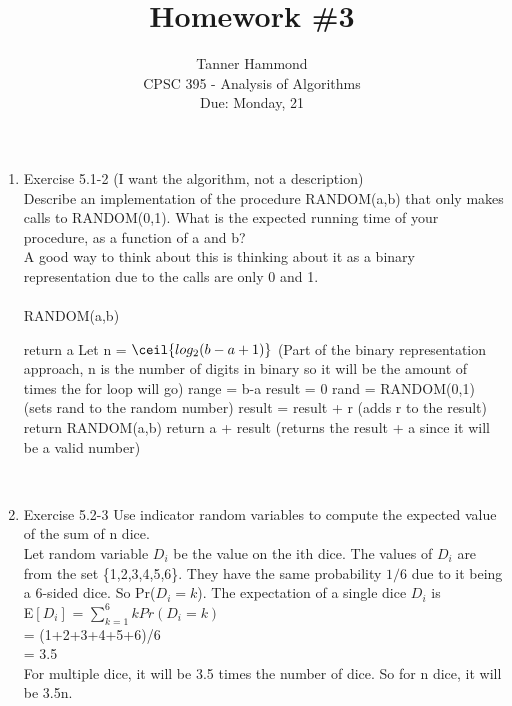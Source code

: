 \documentclass[12pt]{article}
\begin{document}
 
 
 
\title{Homework \#3}%
\author{Tanner Hammond\\ %
CPSC 395 - Analysis of Algorithms
\\ Due: Monday, 21} %
\date{}
\maketitle

\begin{enumerate}
\item Exercise 5.1-2 (I want the algorithm, not a description) \\
Describe an implementation of the procedure RANDOM(a,b) that only makes calls
to RANDOM(0,1). What is the expected running time of your procedure, as a
function of a and b? \\
A good way to think about this is thinking about it as a binary representation due to the calls are only 0 and 1. \\
\\
RANDOM(a,b) 
\begin{algorithmic}
\STATE return a
\ENDIF
\STATE Let n = $\ceil{log_2(b-a+1)}$ (Part of the binary representation approach, n is the number of digits in binary so it will be the amount of times the for loop will go) 
\STATE range = b-a
\STATE result = 0 
\STATE rand = RANDOM(0,1) (sets rand to the random number)
\STATE result = result + r (adds r to the result)
\ENDFOR
{} 
\STATE return RANDOM(a,b)
\ELSE
\STATE  return a + result (returns the result + a since it will be a valid number)
\ENDIF
\end{algorithmic}

\\
\item Exercise 5.2-3
Use indicator random variables to compute the expected value of the sum of n dice. \\
Let random variable $D_i$ be the value on the ith dice. The values of $D_i$ are from the set \{1,2,3,4,5,6\}. They have the same probability $1/6$ due to it being a 6-sided dice. So Pr($D_i = k$).
The expectation of a single dice $D_i$ is \\
E$[D_i]$ = $\sum_{k=1}^{6} kPr(D_i=k)$ \\
= (1+2+3+4+5+6)/6 \\
= 3.5 \\
For multiple dice, it will be 3.5 times the number of dice. So for n dice, it will be 3.5n.


\end{enumerate}
\end{document}
